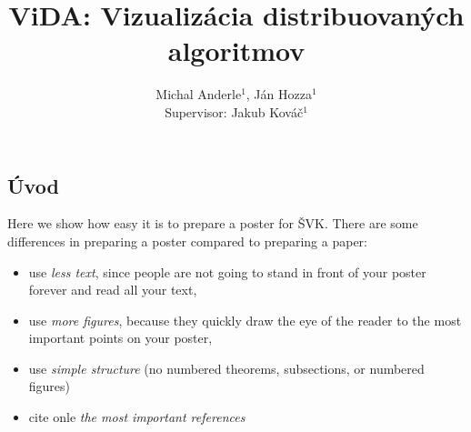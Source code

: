 \documentclass[myposter,portrait]{sciposter}
\def\mysection#1{
{\color{sectionCol}\section*{\sc\bfseries #1}}}
\begin{document}
\setlength{\logowidth}{20cm}
\setlength{\titlewidth}{\textwidth}
\addtolength{\titlewidth}{-\logowidth}
\useleftlogofalse

\color{textCol}

\title{ViDA: Vizualizácia distribuovaných algoritmov}
\author{Michal Anderle$^1$, Ján Hozza$^1$\\
        Supervisor: Jakub Kováč$^1$}
\maketitle

\begin{multicols*}{3}





\mysection{Úvod}
Here we show how easy it is to prepare a poster for ŠVK.
There are some differences in preparing a poster compared to
preparing a paper:

\begin{itemize}
\item use \emph{less text}, since people are not going to stand
      in front of your poster forever and read all your text,
\item use \emph{more figures}, because they quickly draw the
      eye of the reader to the most important points on your poster,
\item use \emph{simple structure} (no numbered theorems, subsections,
      or numbered figures)
\item cite onle \emph{the most important references}
\end{itemize}




\end{multicols*}
\end{document}
